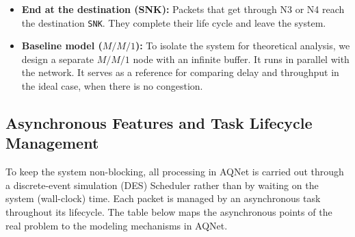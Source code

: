 \begin{itemize}
\begin{itemize}
    \end{itemize}
     \item \textbf{End at the destination (SNK):} Packets that get through N3 or N4 reach the destination \texttt{SNK}. They complete their life cycle and leave the system.
     \item \textbf{Baseline model ($M/M/1$):} To isolate the system for theoretical analysis, we design a separate $M/M/1$ node with an infinite buffer. It runs in parallel with the network. It serves as a reference for comparing delay and throughput in the ideal case, when there is no congestion.
\end{itemize}


\subsection{Asynchronous Features and Task Lifecycle Management}
To keep the system non-blocking, all processing in AQNet is carried
out through a discrete-event simulation (DES) Scheduler rather than by
waiting on the system (wall-clock) time. Each packet is managed by an
asynchronous task throughout its lifecycle. The table below maps the asynchronous points of the real problem to the modeling mechanisms in AQNet.


